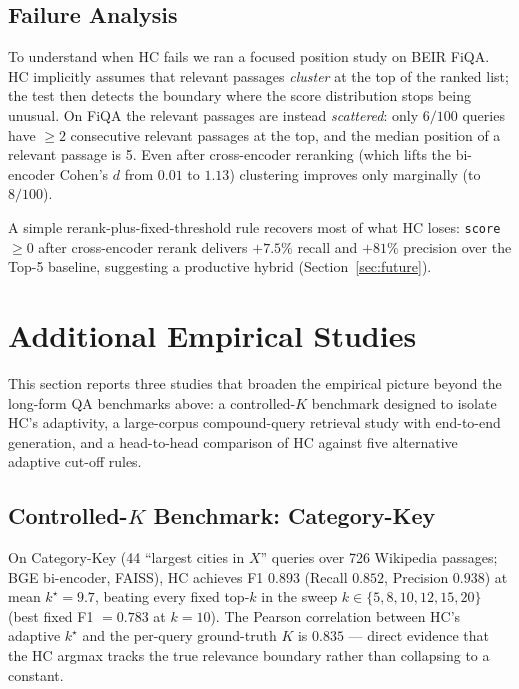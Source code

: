 \documentclass[letterpaper]{article}
\newcommand{\CatHCF}{0.893}
\newcommand{\CatHCR}{0.852}
\newcommand{\CatHCP}{0.938}
\newcommand{\CatHCK}{9.7}
\newcommand{\CatCorrK}{0.835}
\begin{document}
\subsection{Failure Analysis}
\label{sec:failure}
To understand when HC fails we ran a focused position study on BEIR
FiQA. HC implicitly assumes that relevant passages \emph{cluster} at
the top of the ranked list; the test then detects the boundary where
the score distribution stops being unusual. On FiQA the relevant
passages are instead \emph{scattered}: only $6/100$ queries have
$\ge 2$ consecutive relevant passages at the top, and the median
position of a relevant passage is 5. Even after cross-encoder
reranking (which lifts the bi-encoder Cohen's $d$ from $0.01$ to
$1.13$) clustering improves only marginally (to $8/100$).

A simple rerank-plus-fixed-threshold rule recovers most of what HC
loses: \texttt{score $\ge 0$} after cross-encoder rerank delivers
$+7.5\%$ recall and $+81\%$ precision over the Top-5 baseline,
suggesting a productive hybrid (Section~\ref{sec:future}).

\section{Additional Empirical Studies}
\label{sec:prelim}

This section reports three studies that broaden the empirical
picture beyond the long-form QA benchmarks above: a controlled-$K$
benchmark designed to isolate HC's adaptivity, a large-corpus
compound-query retrieval study with end-to-end generation, and a
head-to-head comparison of HC against five alternative adaptive
cut-off rules.

\subsection{Controlled-$K$ Benchmark: Category-Key}
On Category-Key (44 ``largest cities in $X$'' queries over 726
Wikipedia passages; BGE bi-encoder, FAISS), HC achieves F1
$\CatHCF$ (Recall $\CatHCR$, Precision $\CatHCP$) at mean
$k^\star = \CatHCK$, beating every fixed top-$k$ in the sweep
$k \in \{5,8,10,12,15,20\}$ (best fixed F1 $= 0.783$ at $k{=}10$).
The Pearson correlation between HC's adaptive $k^\star$ and the
per-query ground-truth $K$ is $\CatCorrK$ --- direct evidence that
the HC argmax tracks the true relevance boundary rather than
collapsing to a constant.
\end{document}
